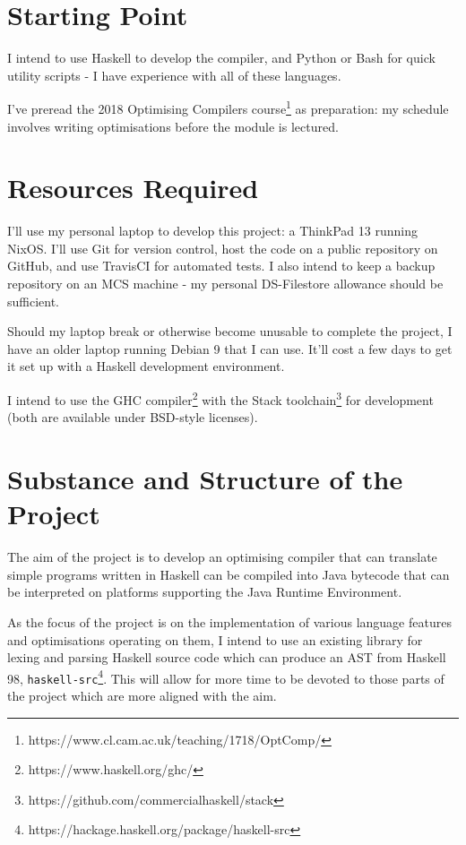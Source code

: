 \documentclass[12pt]{article}
\newcommand\monospace[1]{\texttt{#1}}
\begin{document}
\section*{Starting Point}

I intend to use Haskell to develop the compiler, and Python or Bash for quick utility scripts - I have experience with
all of these languages.

I've preread the 2018 Optimising Compilers course\footnote{https://www.cl.cam.ac.uk/teaching/1718/OptComp/} as
preparation: my schedule involves writing optimisations before the module is lectured.


\section*{Resources Required}

I'll use my personal laptop to develop this project: a ThinkPad 13 running NixOS. I'll use Git for version control, host
the code on a public repository on GitHub, and use TravisCI for automated tests. I also intend to keep a backup
repository on an MCS machine - my personal DS-Filestore allowance should be sufficient.

Should my laptop break or otherwise become unusable to complete the project, I have an older laptop running Debian 9
that I can use. It'll cost a few days to get it set up with a Haskell development environment.

I intend to use the GHC compiler\footnote{https://www.haskell.org/ghc/} with the Stack
toolchain\footnote{https://github.com/commercialhaskell/stack} for development (both are available under BSD-style
licenses).


\section*{Substance and Structure of the Project}

The aim of the project is to develop an optimising compiler that can translate simple programs written in Haskell can be
compiled into Java bytecode that can be interpreted on platforms supporting the Java Runtime Environment.

As the focus of the project is on the implementation of various language features and optimisations operating on them, I
intend to use an existing library for lexing and parsing Haskell source code which can produce an AST from Haskell 98,
\monospace{haskell-src}\footnote{https://hackage.haskell.org/package/haskell-src}. This will allow for more time to be
devoted to those parts of the project which are more aligned with the aim.
\end{document}
